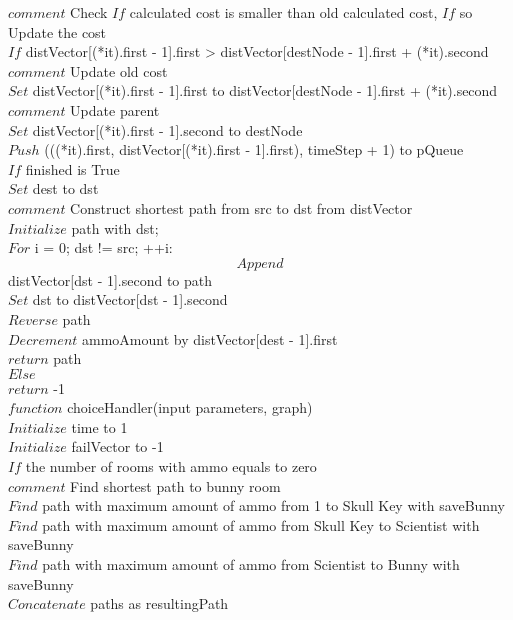 \documentclass[10pt]{article}
\begin{document}
					$comment$ Check $If$ calculated cost is smaller than old calculated cost, $If$ so Update the cost \\
					$If$ distVector[(*it).first - 1].first > distVector[destNode - 1].first + (*it).second \\

						$comment$ Update old cost \\
	                    $Set$ distVector[(*it).first - 1].first to distVector[destNode - 1].first + (*it).second \\
	                    $comment$ Update parent \\
	                    $Set$ distVector[(*it).first - 1].second to destNode \\
	                    $Push$ (((*it).first, distVector[(*it).first - 1].first), timeStep + 1) to pQueue \\
	
	$If$ finished is True \\

        $Set$ dest to dst \\
        
        $comment$ Construct shortest path from src to dst from distVector \\
        $Initialize$ path with dst;      \\
        $For$ i = 0; dst != src; ++i: \\
        	$$Append$$ distVector[dst - 1].second to path \\
            $Set$ dst to distVector[dst - 1].second \\
        
        $Reverse$ path \\
        $Decrement$ ammoAmount by distVector[dest - 1].first \\
        $return$ path \\
    
    $Else$ \\
    	$return$ {-1}    \\


$function$ choiceHandler(input parameters, graph)  \\

	$Initialize$ time to 1 \\
	$Initialize$ failVector to {-1} \\

	$If$ the number of rooms with ammo equals to zero \\

		$comment$  Find shortest path to bunny room \\
		 $Find$ path with maximum amount of ammo from 1 to Skull Key with saveBunny  \\
		 $Find$ path with maximum amount of ammo from Skull Key to Scientist with saveBunny \\
		 $Find$ path with maximum amount of ammo from Scientist to Bunny with saveBunny \\
		$Concatenate$ paths as resultingPath \\
\end{document}
